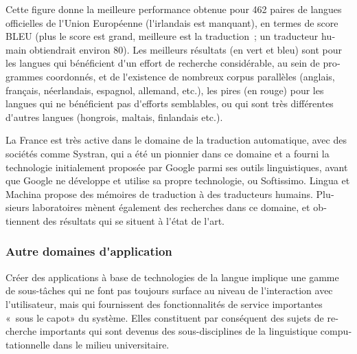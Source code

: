 \begin{french}
\begin{multicols}{2}

Cette figure donne la meilleure performance obtenue pour 462 paires de
langues officielles de l{\mbox '}Union Européenne (l{\mbox '}irlandais est manquant),
en termes de score BLEU (plus le score est grand, meilleure est la
traduction~; un traducteur humain obtiendrait environ 80). Les
meilleurs résultats (en vert et bleu) sont pour les langues qui
bénéficient d{\mbox '}un effort de recherche considérable, au sein de
programmes coordonnés, et de l{\mbox '}existence de nombreux corpus parallèles
(anglais, français, néerlandais, espagnol, allemand, etc.), les pires
(en rouge) pour les langues qui ne bénéficient pas d{\mbox '}efforts
semblables, ou qui sont très différentes d{\mbox '}autres langues (hongrois,
maltais, finlandais etc.).

La France est très active dans le domaine de la traduction
automatique, avec des sociétés comme Systran, qui a été un pionnier
dans ce domaine et a fourni la technologie initialement proposée par
Google parmi ses outils linguistiques, avant que Google ne développe
et utilise sa propre technologie, ou Softissimo. Lingua et Machina
propose des mémoires de traduction à des traducteurs
humains. Plusieurs laboratoires mènent également des recherches dans
ce domaine, et obtiennent des résultats qui se situent à l{\mbox '}état de
l{\mbox '}art.\\

\subsubsection{Autre domaines d{\mbox '}application}

Créer des applications à base de technologies de la langue implique
une gamme de sous-tâches qui ne font pas toujours surface au niveau de
l{\mbox '}interaction avec l{\mbox '}utilisateur, mais qui fournissent des
fonctionnalités de service importantes «~sous le capot» du
système. Elles constituent par conséquent des sujets de recherche
importants qui sont devenus des sous-disciplines de la linguistique
computationnelle dans le milieu universitaire.


\end{multicols}
\end{french}

